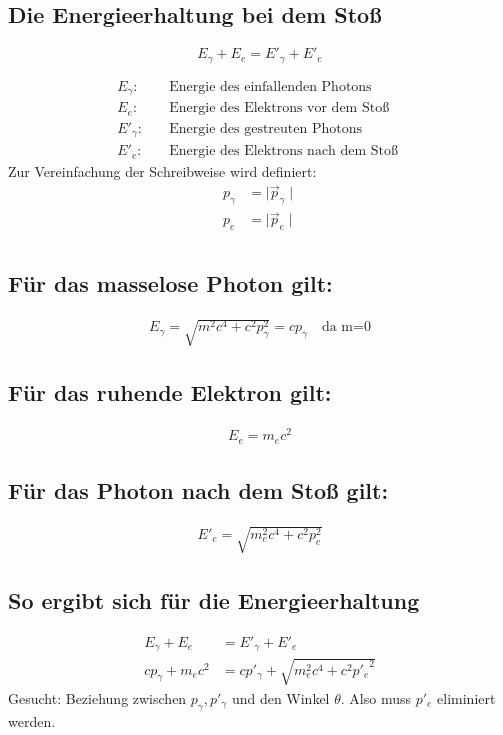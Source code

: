\subsection{Die Energieerhaltung bei dem Stoß}
\[
E_\gamma + E_e = E'_\gamma + E'_e
\]

\begin{align*}
	E_\gamma :&\quad \text{Energie des einfallenden Photons} \\
	E_e       : &\quad \text{Energie des Elektrons vor dem Stoß } \\
	E'_\gamma  :&\quad \text{Energie des gestreuten Photons} \\
	E'_e       :&\quad \text{Energie des Elektrons nach dem Stoß }
\end{align*}
Zur Vereinfachung der Schreibweise wird definiert:\\
\begin{align*}
	p_\gamma &=	\mid   \overrightarrow{p}_\gamma\mid\\
	p_e &=	\mid   \overrightarrow{p}_e\mid\\
\end{align*}



\subsection{Für das masselose Photon gilt: }
\begin{align*}
	E_\gamma =\sqrt{m^2c^4+c^2p_\gamma^2}=cp_\gamma\quad \text{da m=0}
\end{align*}

\subsection{Für das ruhende Elektron gilt: }
\begin{align*}
	E_e =m_ec^2
\end{align*}
\subsection{Für das Photon nach dem Stoß  gilt: }
\begin{align*}
	E'_e =\sqrt{m_e^2c^4+c^2p_e^2}
\end{align*}
\subsection{So ergibt sich für die Energieerhaltung}
\begin{align}
	E_\gamma + E_e&= E'_\gamma + E'_e\nonumber\\
	cp_\gamma+m_ec^2&=cp'_\gamma+\sqrt{m_e^2c^4+c^2{p'_e}^2} \label{Energie}
\end{align}
Gesucht: Beziehung zwischen $p_\gamma, p'_\gamma$ und den Winkel $\theta$. Also muss $p'_e$ eliminiert werden.\\
